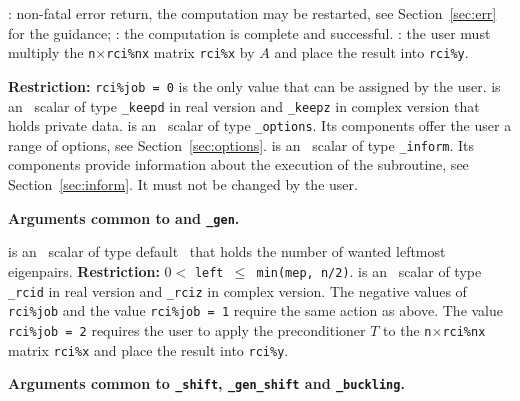 \begin{description}
\begin{description}
%
: 
non-fatal error return, the computation may be restarted,
see Section~\ref{sec:err} for the guidance;
%
: the computation is complete and successful.
%
: 
the user must multiply the {\tt n}$\times${\tt rci\%nx} matrix
{\tt rci\%x} by $A$ and place the result into {\tt rci\%y}.
%
\end{description}
%
{\bf Restriction:} 
{\tt rci\%job = 0} is the only value that can be assigned by the user.
%
 is an \intentinout\ scalar of type 
{\tt \solver\_keepd} in real version and
{\tt \solver\_keepz} in complex version
that holds private data. 
%
 is an \intentin\  scalar  of type {\tt \solver\_options}.
Its components offer the user a range of options,
see Section~\ref{sec:options}.
%
 is an \intentinout\ scalar of type 
{\tt \solver\_inform}. Its components provide information about the execution
of the subroutine, see Section~\ref{sec:inform}.
It must not be changed by the user.
%
\end{description}

\medskip
\noindent
{\bf Arguments common to 
{\tt \solver} and {\tt \solver\_gen}.}

\begin{description}
%
 is an \intentin\ scalar of type default \Integer\ 
that holds the number of wanted leftmost eigenpairs.
{\bf Restriction:} {$0 <$ \tt left $\le$ min(mep, n/2)}.
%
 is an \intentinout\  scalar  of type
{\tt \solver\_rcid} in real version and
{\tt \solver\_rciz} in complex version.
The negative values of {\tt rci\%job}
and the value {\tt rci\%job = 1}
require the same action as above.
The value {\tt rci\%job = 2} requires the user to
apply the preconditioner $T$ to the {\tt n}$\times${\tt rci\%nx} matrix
{\tt rci\%x} and place the result into {\tt rci\%y}.
%
\end{description}

\medskip
\noindent
{\bf Arguments common to 
{\tt \solver\_shift}, {\tt \solver\_gen\_shift}
and {\tt \solver\_buckling}.}

